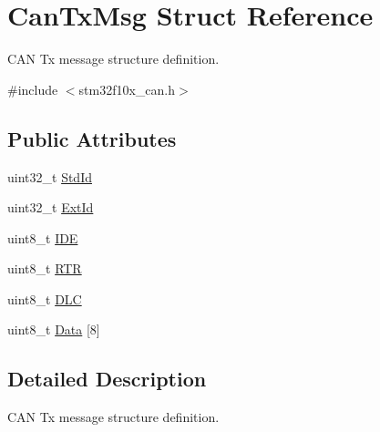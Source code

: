 \hypertarget{structCanTxMsg}{
\section{CanTxMsg Struct Reference}
\label{structCanTxMsg}
}


CAN Tx message structure definition.  




{\ttfamily \#include $<$stm32f10x\_\-can.h$>$}

\subsection*{Public Attributes}
\begin{DoxyCompactItemize}
\item 
uint32\_\-t \hyperlink{structCanTxMsg_abfb50c8208227f8cf378f29cf9a3a6f3}{StdId}
\item 
uint32\_\-t \hyperlink{structCanTxMsg_a33050a95a4cc463b589ff16bdd416f22}{ExtId}
\item 
uint8\_\-t \hyperlink{structCanTxMsg_aa4c8568a0e3250a17bd7e116b3e09670}{IDE}
\item 
uint8\_\-t \hyperlink{structCanTxMsg_a69f84255db38c6910058f290efdb7302}{RTR}
\item 
uint8\_\-t \hyperlink{structCanTxMsg_ab49d0fa602aad2fd9cd007adafc11fc2}{DLC}
\item 
uint8\_\-t \hyperlink{structCanTxMsg_aabfbf718f627da26d9e3cf903dc0ad02}{Data} \mbox{[}8\mbox{]}
\end{DoxyCompactItemize}


\subsection{Detailed Description}
CAN Tx message structure definition. 

